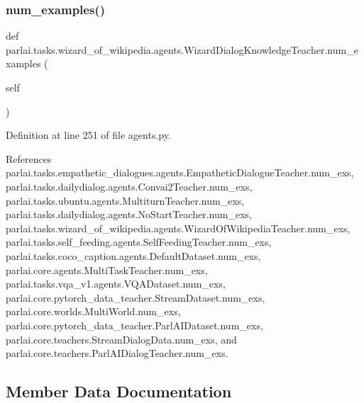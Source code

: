 \subsubsection{\texorpdfstring{num\+\_\+examples()}{num\_examples()}}
{\footnotesize\ttfamily def parlai.\+tasks.\+wizard\+\_\+of\+\_\+wikipedia.\+agents.\+Wizard\+Dialog\+Knowledge\+Teacher.\+num\+\_\+examples (\begin{DoxyParamCaption}\item[{}]{self }\end{DoxyParamCaption})}



Definition at line 251 of file agents.\+py.



References parlai.\+tasks.\+empathetic\+\_\+dialogues.\+agents.\+Empathetic\+Dialogue\+Teacher.\+num\+\_\+exs, parlai.\+tasks.\+dailydialog.\+agents.\+Convai2\+Teacher.\+num\+\_\+exs, parlai.\+tasks.\+ubuntu.\+agents.\+Multiturn\+Teacher.\+num\+\_\+exs, parlai.\+tasks.\+dailydialog.\+agents.\+No\+Start\+Teacher.\+num\+\_\+exs, parlai.\+tasks.\+wizard\+\_\+of\+\_\+wikipedia.\+agents.\+Wizard\+Of\+Wikipedia\+Teacher.\+num\+\_\+exs, parlai.\+tasks.\+self\+\_\+feeding.\+agents.\+Self\+Feeding\+Teacher.\+num\+\_\+exs, parlai.\+tasks.\+coco\+\_\+caption.\+agents.\+Default\+Dataset.\+num\+\_\+exs, parlai.\+core.\+agents.\+Multi\+Task\+Teacher.\+num\+\_\+exs, parlai.\+tasks.\+vqa\+\_\+v1.\+agents.\+V\+Q\+A\+Dataset.\+num\+\_\+exs, parlai.\+core.\+pytorch\+\_\+data\+\_\+teacher.\+Stream\+Dataset.\+num\+\_\+exs, parlai.\+core.\+worlds.\+Multi\+World.\+num\+\_\+exs, parlai.\+core.\+pytorch\+\_\+data\+\_\+teacher.\+Parl\+A\+I\+Dataset.\+num\+\_\+exs, parlai.\+core.\+teachers.\+Stream\+Dialog\+Data.\+num\+\_\+exs, and parlai.\+core.\+teachers.\+Parl\+A\+I\+Dialog\+Teacher.\+num\+\_\+exs.



\subsection{Member Data Documentation}
\mbox{\label{classparlai_1_1tasks_1_1wizard__of__wikipedia_1_1agents_1_1WizardDialogKnowledgeTeacher_ac8ea6c9184d7ca02160700ed481f480c}} 

